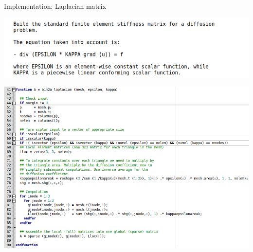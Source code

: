 \documentclass[aspectratio=54,xcolor=dvipsnames]{beamer}
\begin{document}
\begin{frame}{Implementation: Laplacian matrix}
    \begin{center}
        \begin{minipage}{0.55\textwidth}
            \centering
            \includegraphics[width=\textwidth]{Images/bim_lap_help.png}
        \end{minipage}\hfill
        \begin{minipage}{0.88\textwidth}
            \centering
            \includegraphics[width=\textwidth]{Images/bim_laplacian.png}
        \end{minipage}
    \end{center}
\end{frame}
\end{document}
